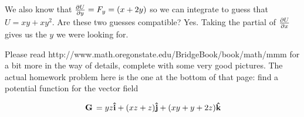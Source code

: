 \documentclass[12pt]{article}
\begin{document}
We also know that $\frac{\partial U}{\partial y} = F_y = (x+2y)$ so we can integrate to
guess that $U = xy + xy^2$. Are these two guesses compatible?
Yes. Taking the partial of $\frac{\partial U}{\partial x}$ gives us the $y$ we were
looking for.

Please read http://www.math.oregonstate.edu/BridgeBook/book/math/mmm
for a bit more in the way of details, complete with some very good
pictures. The actual homework problem here is the one at the bottom of
that page: find a potential function for the vector field

\begin{equation}
  \,\mathbf{G}\, = yz\mathbf{\hat{i}} + (xz+z)\mathbf{\hat{j}} + (xy+y+2z)\mathbf{\hat{k}}
\end{equation}
\end{document}
